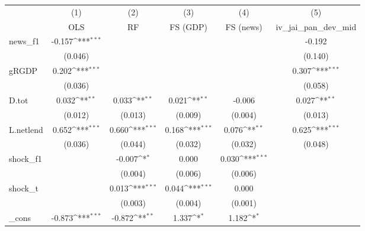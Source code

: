 {
\def\sym#1{\ifmmode^{#1}\else\(^{#1}\)\fi}
\begin{tabular}{l*{5}{c}}
\toprule
            &\multicolumn{1}{c}{(1)}&\multicolumn{1}{c}{(2)}&\multicolumn{1}{c}{(3)}&\multicolumn{1}{c}{(4)}&\multicolumn{1}{c}{(5)}\\
            &\multicolumn{1}{c}{OLS}&\multicolumn{1}{c}{RF}&\multicolumn{1}{c}{FS (GDP)}&\multicolumn{1}{c}{FS (news)}&\multicolumn{1}{c}{iv\_jai\_pan\_dev\_mid}\\
\midrule
news\_f1     &      -0.157\sym{***}&                     &                     &                     &      -0.192         \\
            &     (0.046)         &                     &                     &                     &     (0.140)         \\
\addlinespace
gRGDP       &       0.202\sym{***}&                     &                     &                     &       0.307\sym{***}\\
            &     (0.036)         &                     &                     &                     &     (0.058)         \\
\addlinespace
D.tot       &       0.032\sym{**} &       0.033\sym{**} &       0.021\sym{**} &      -0.006         &       0.027\sym{**} \\
            &     (0.012)         &     (0.013)         &     (0.009)         &     (0.004)         &     (0.013)         \\
\addlinespace
L.netlend   &       0.652\sym{***}&       0.660\sym{***}&       0.168\sym{***}&       0.076\sym{**} &       0.625\sym{***}\\
            &     (0.036)         &     (0.044)         &     (0.032)         &     (0.032)         &     (0.048)         \\
\addlinespace
shock\_f1    &                     &      -0.007\sym{*}  &       0.000         &       0.030\sym{***}&                     \\
            &                     &     (0.004)         &     (0.006)         &     (0.006)         &                     \\
\addlinespace
shock\_t     &                     &       0.013\sym{***}&       0.044\sym{***}&       0.000         &                     \\
            &                     &     (0.003)         &     (0.004)         &     (0.001)         &                     \\
\addlinespace
\_cons      &      -0.873\sym{***}&      -0.872\sym{**} &       1.337\sym{*}  &       1.182\sym{*}  &                     \\

\end{tabular}}
